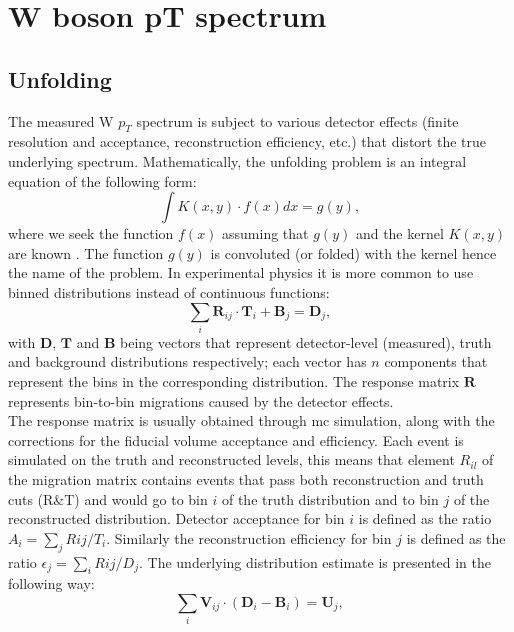 \chapter{W boson pT spectrum}

\section{Unfolding}
The measured W $p_T$ spectrum is subject to various detector effects (finite resolution and acceptance, reconstruction efficiency, etc.) that distort the true underlying spectrum. Mathematically, the unfolding problem is an integral equation of the following form:
\begin{equation}
	\int K(x,y)\cdot f(x)dx = g(y),
\end{equation}
where we seek the function $f(x)$ assuming that $g(y)$ and the kernel $K(x,y)$ are known \cite{Schmitt:2016orm}. The function $g(y)$ is convoluted (or folded) with the kernel hence the name of the problem. In experimental physics it is more common to use binned distributions instead of continuous functions: 
\begin{equation}
\sum_{i} \textbf{R}_{ij}\cdot \textbf{T}_i + \textbf{B}_j = \textbf{D}_j,
\end{equation}
with $\textbf{D}$, $\textbf{T}$ and $\textbf{B}$ being vectors that represent detector-level (measured), truth and background distributions respectively; each vector has $n$ components that represent the bins in the corresponding distribution. The response matrix $\textbf{R}$ represents bin-to-bin migrations caused by the detector effects. \\
The response matrix is usually obtained through \gls{mc} simulation, along with the corrections for the fiducial volume acceptance and efficiency. Each event is simulated on the truth and reconstructed levels, this means that element $R_{il}$ of the migration matrix contains events that pass both reconstruction and truth cuts (R\&T) and would go to bin $i$ of the truth distribution and to bin $j$ of the reconstructed distribution. Detector acceptance for bin $i$ is defined as the ratio $A_i=\sum_j R{ij}/T_i$. Similarly the reconstruction efficiency for bin $j$ is defined as the ratio $\epsilon_j=\sum_i R{ij}/D_j$.
The underlying distribution estimate is presented in the following way:
\begin{equation}
\sum_{i} \textbf{V}_{ij}\cdot (\textbf{D}_i - \textbf{B}_i) = \textbf{U}_j,
\end{equation}
